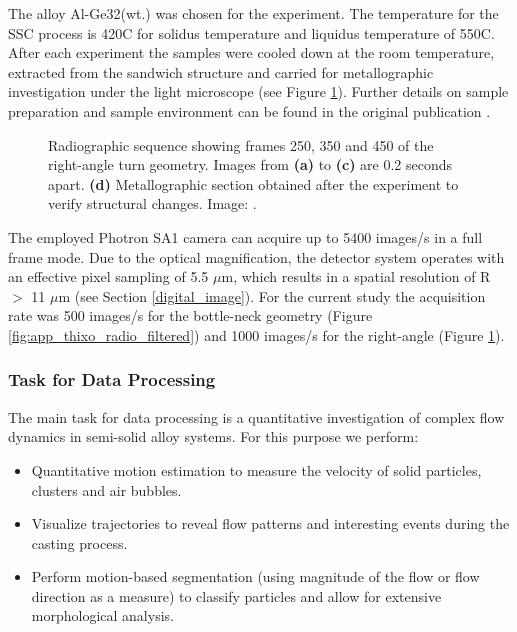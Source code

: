 The alloy Al-Ge32(wt.) was chosen for the experiment. The temperature for the SSC process is 420C for solidus temperature and liquidus temperature of 550C. After each experiment the samples were cooled down at the room temperature, extracted from the sandwich structure and carried for metallographic investigation under the light microscope (see Figure \ref{fig:app_thixo_radios}). Further details on sample preparation and sample environment can be found in the original publication \cite{Zabler13}.

\begin{figure}[ht]
  \centerline{
    \mbox{}
    \mbox{}  
  } 
  \vspace{3pt}
  \centerline{
  	\mbox{}
  	\mbox{}  
  }  
  \caption{Radiographic sequence showing frames 250, 350 and 450 of the right-angle turn geometry. Images from \textbf{(a)} to \textbf{(c)} are 0.2 seconds apart. \textbf{(d)} Metallographic section obtained after the experiment to verify structural changes. Image: \cite{Zabler13}.
  \label{fig:app_thixo_radios}}
\end{figure}


The employed Photron SA1 camera can acquire up to 5400 images/s in a full frame
mode. Due to the optical magnification, the detector system operates with an effective pixel sampling of 5.5 $\mu$m, which results in a spatial resolution of R $>$ 11 $\mu$m (see Section \ref{digital_image}). For the current study the acquisition rate was 500 images/s for the bottle-neck geometry (Figure \ref{fig:app_thixo_radio_filtered}) and 1000 images/s for the right-angle (Figure \ref{fig:app_thixo_radios}). 



\subsubsection{Task for Data Processing}

The main task for data processing is a quantitative investigation of complex flow dynamics in semi-solid alloy systems. For this purpose we perform:
\begin{itemize}
	\item Quantitative motion estimation to measure  the velocity of solid particles, clusters and air bubbles.
	
	\item Visualize trajectories to reveal flow patterns and interesting events during the casting process.
	
	\item Perform motion-based segmentation (using magnitude of the flow or flow direction as a measure) to classify particles and allow for extensive morphological analysis.
	  
\end{itemize}

